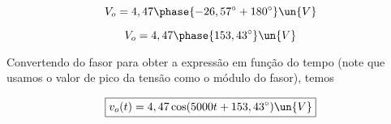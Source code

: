 \[ V_o = 4,47\phase{-26,57^{\circ} + 180^{\circ}} \un{V} \]

\[ V_o = 4,47\phase{153,43^{\circ}} \un{V} \]

Convertendo do fasor para obter a expressão em função do tempo (note que usamos o valor de pico da tensão como o módulo do fasor),
temos

\[ \boxed{v_o(t) = 4,47\cos(5000t + 153,43^{\circ}) \un{V}}  \]











    























